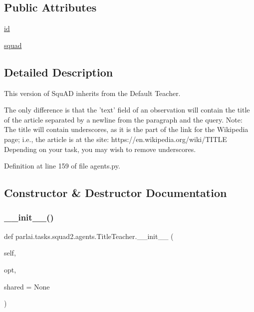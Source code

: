 \subsection*{Public Attributes}
\begin{DoxyCompactItemize}
\item 
\hyperlink{classparlai_1_1tasks_1_1squad2_1_1agents_1_1TitleTeacher_a7c29404ea09cd71791d48377d35d8e6d}{id}
\item 
\hyperlink{classparlai_1_1tasks_1_1squad2_1_1agents_1_1TitleTeacher_a192c7e24f0159dcb8c512526e7f8a1fb}{squad}
\end{DoxyCompactItemize}


\subsection{Detailed Description}
\begin{DoxyVerb}This version of SquAD inherits from the Default Teacher.

The only
difference is that the 'text' field of an observation will contain
the title of the article separated by a newline from the paragraph and the
query.
Note: The title will contain underscores, as it is the part of the link for
the Wikipedia page; i.e., the article is at the site:
https://en.wikipedia.org/wiki/{TITLE}
Depending on your task, you may wish to remove underscores.
\end{DoxyVerb}
 

Definition at line 159 of file agents.\+py.



\subsection{Constructor \& Destructor Documentation}
\mbox{\label{classparlai_1_1tasks_1_1squad2_1_1agents_1_1TitleTeacher_ad0306665ca749e4b3bb3835d81e3e26b}} 
\subsubsection{\texorpdfstring{\+\_\+\+\_\+init\+\_\+\+\_\+()}{\_\_init\_\_()}}
{\footnotesize\ttfamily def parlai.\+tasks.\+squad2.\+agents.\+Title\+Teacher.\+\_\+\+\_\+init\+\_\+\+\_\+ (\begin{DoxyParamCaption}\item[{}]{self,  }\item[{}]{opt,  }\item[{}]{shared = {\ttfamily None} }\end{DoxyParamCaption})}



